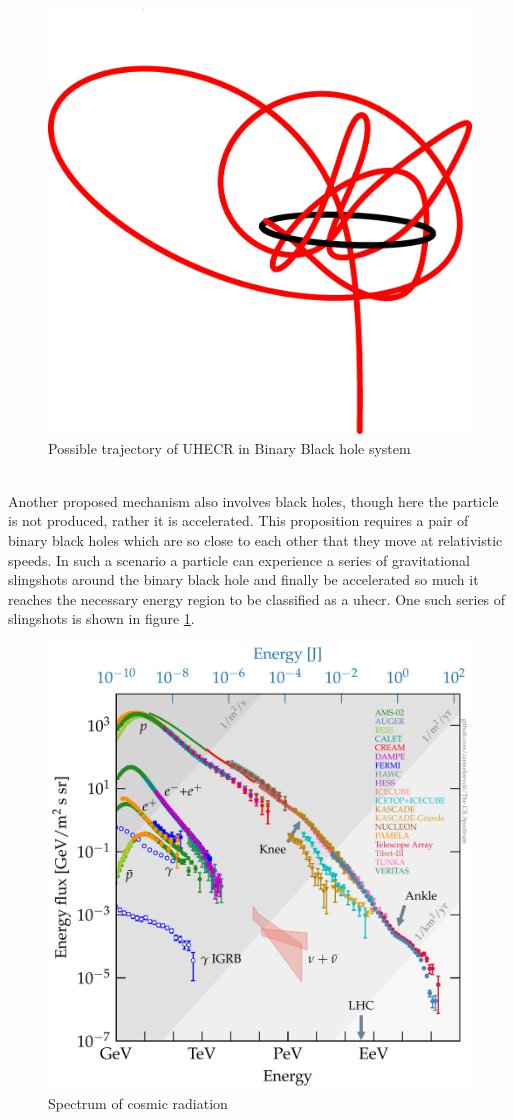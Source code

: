 \documentclass[abstract,toc,los,english,11pt,glossaries]{jluthesis}
\begin{document}
\begin{figure}[ht!]
	\centering
	\includegraphics[width=0.4\linewidth]{data/trajectory-binary-bh}
	\caption{Possible trajectory of UHECR in Binary Black hole system \cite{Zhang2020}}
	\label{fig:trajectory-binary-bh}
\end{figure} \\
Another proposed mechanism also involves black holes, though here the particle is not produced, rather it is accelerated. This proposition requires a pair of binary black holes which are so close to each other that they move at relativistic speeds. In such a scenario a particle can experience a series of gravitational slingshots\cite{Zhang2020} around the binary black hole and finally be accelerated so much it reaches the necessary energy region to be classified as a \acrshort{uhecr}. One such series of slingshots is shown in figure \ref{fig:trajectory-binary-bh}. \\
\begin{figure}[ht!]
	\centering
	\includegraphics[width=0.8\linewidth]{data/cr_spectrum}
	\caption{Spectrum of cosmic radiation \cite{evoli_carmelo_2020_4396125}}
	\label{fig:cr_spectrum}
\end{figure} \\
\end{document}
